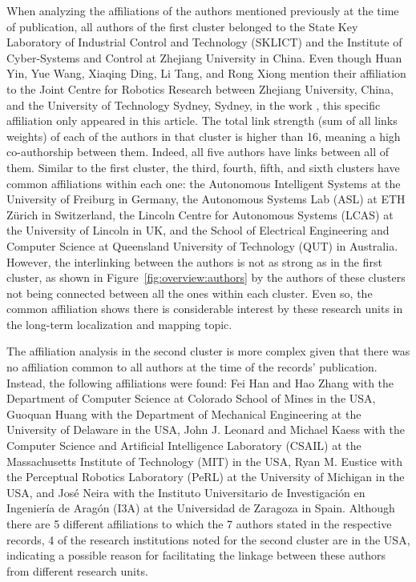 When analyzing the affiliations of the authors mentioned previously at the time of publication, all authors of the first cluster belonged to the State Key Laboratory of Industrial Control and Technology (SKLICT) and the Institute of Cyber-Systems and Control at Zhejiang University in China. Even though Huan Yin, Yue Wang, Xiaqing Ding, Li Tang, and Rong Xiong mention their affiliation to the Joint Centre for Robotics Research between Zhejiang University, China, and the University of Technology Sydney, Sydney, in the work \parencite{yin-et-al:2020:2905046}, this specific affiliation only appeared in this article. The total link strength (sum of all links weights) of each of the authors in that cluster is higher than 16, meaning a high co-authorship between them. Indeed, all five authors have links between all of them.
Similar to the first cluster, the third, fourth, fifth, and sixth clusters have common affiliations within each one: the Autonomous Intelligent Systems at the University of Freiburg in Germany, the Autonomous Systems Lab (ASL) at ETH Zürich in Switzerland, the Lincoln Centre for Autonomous Systems (LCAS) at the University of Lincoln in UK, and the School of Electrical Engineering and Computer Science at Queensland University of Technology (QUT) in Australia.
However, the interlinking between the authors is not as strong as in the first cluster, as shown in Figure~\ref{fig:overview:authors} by the authors of these clusters not being connected between all the ones within each cluster. Even so, the common affiliation shows there is considerable interest by these research units in the long-term localization and mapping topic.

The affiliation analysis in the second cluster is more complex given that there was no affiliation common to all authors at the time of the records' publication. Instead, the following affiliations were found: Fei Han and Hao Zhang with the Department of Computer Science at Colorado School of Mines in the USA, Guoquan Huang with the Department of Mechanical Engineering at the University of Delaware in the USA, John J. Leonard and Michael Kaess with the Computer Science and Artificial Intelligence Laboratory (CSAIL) at the Massachusetts Institute of Technology (MIT) in the USA, Ryan M. Eustice with the Perceptual Robotics Laboratory (PeRL) at the University of Michigan in the USA, and José Neira with the Instituto Universitario de Investigación en Ingeniería de Aragón (I3A) at the Universidad de Zaragoza in Spain.
Although there are 5 different affiliations to which the 7 authors stated in the respective records, 4 of the research institutions noted for the second cluster are in the USA, indicating a possible reason for facilitating the linkage between these authors from different research units.

